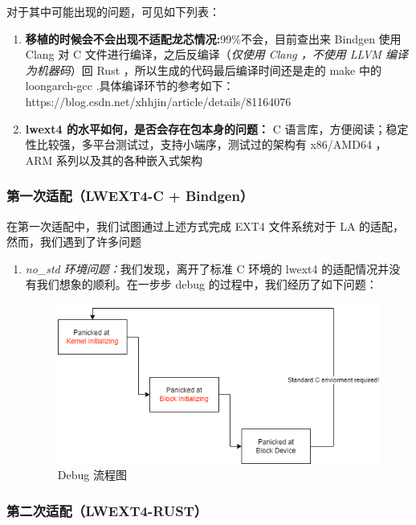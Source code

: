 \vspace{1em}

对于其中可能出现的问题，可见如下列表：

\begin{enumerate}
    \item \textbf{移植的时候会不会出现不适配龙芯情况:}99\%不会，目前查出来 Bindgen 使用 Clang 对 C 文件进行编译，之后反编译（\textit{仅使用 Clang ，不使用 LLVM 编译为机器码}）回 Rust ，所以生成的代码最后编译时间还是走的 make 中的 loongarch-gcc .具体编译环节的参考如下：https://blog.csdn.net/xhhjin/article/details/81164076
    \item \textbf{lwext4 的水平如何，是否会存在包本身的问题：} C 语言库，方便阅读；稳定性比较强，多平台测试过，支持小端序，测试过的架构有 x86/AMD64 ， ARM 系列以及其的各种嵌入式架构
\end{enumerate}

\subsubsection{第一次适配（LWEXT4-C + Bindgen）}

在第一次适配中，我们试图通过上述方式完成 EXT4 文件系统对于 LA 的适配，然而，我们遇到了许多问题
\begin{enumerate} 
    \item \textit{no_std 环境问题：}我们发现，离开了标准 C 环境的 lwext4 的适配情况并没有我们想象的顺利。在一步步 debug 的过程中，我们经历了如下问题：
    \begin{figure}[htbp] 
        \centering 
        \includegraphics[width=0.5\linewidth]{figs/ext4c.png} 
        \caption{Debug 流程图} 
        \label{debug-ext4c} 
    \end{figure} 
\end{enumerate}

\subsubsection{第二次适配（LWEXT4-RUST）}

